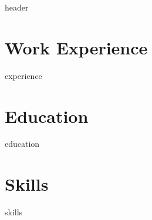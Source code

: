 \documentclass[letter,10pt]{article}
\author{Luis Baez}
\begin{document}
{header}
\vspace*{10pt}

\section{Work Experience}
{experience}
\vspace*{10pt}

\section{Education}
{education}
\vspace*{10pt}


\section{Skills}
\vspace*{3pt}
{skills}
\vspace*{10pt}
\end{document}
